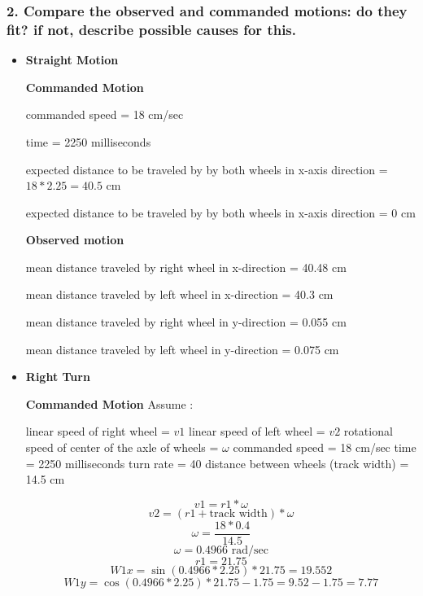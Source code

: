 \documentclass[11pt,a4paper,openright,twoside]{extreport}
\begin{document}
\subsubsection*{2. Compare the observed and commanded motions: do they fit? if not, describe possible causes for this.}
\begin{itemize}
	\item \textbf{Straight Motion}
	
	\textbf{Commanded Motion}
	
	commanded speed = 18 cm/sec
	
	time = 2250 milliseconds
	
	expected distance to be traveled by by both wheels in x-axis direction = $ 18 * 2.25 = 40.5$ cm 
	
	expected distance to be traveled by by both wheels in x-axis direction = $0$ cm
	
	
	\textbf{Observed motion}
	
	mean distance traveled by right wheel in x-direction = 40.48 cm
	
	mean distance traveled by left wheel in x-direction = 40.3 cm 
	
	mean distance traveled by right wheel in y-direction = 0.055 cm 
	
	mean distance traveled by left wheel in y-direction = 0.075 cm 
	
	\item \textbf{Right Turn}
	
	\textbf{Commanded Motion} \newline
	Assume : \newline
	
	linear speed of right wheel = $v1$ \newline
	linear speed of left wheel = $v2$ \newline
	rotational speed of center of the axle of wheels = $\omega$ \newline
	commanded speed = 18 cm/sec \newline
	time = 2250 milliseconds \newline
	turn rate = 40 \newline
	distance between wheels (track width) = 14.5 cm 
	
		$$v1 = r1 * \omega$$
		$$v2 = (r1 + \text{track width} ) * \omega$$
		$$\omega = \frac{18 * 0.4}{14.5}$$
		$$\omega = 0.4966 \text{ rad/sec}$$
		$$r1 = 21.75$$
		$$W1x = \sin(0.4966 * 2.25) * 21.75 = 19.552 $$
		$$W1y = \cos(0.4966 * 2.25) * 21.75 - 1.75 = 9.52 - 1.75 = 7.77$$
	

\end{itemize}
\end{document}

